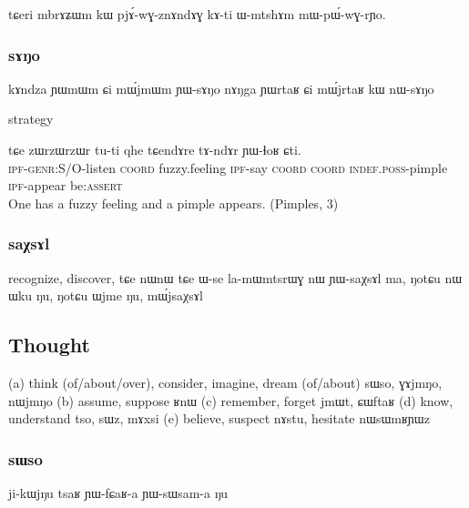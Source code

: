 \documentclass[oldfontcommands,oneside,a4paper,11pt]{article}
\newcommand{\ipa}[1]{{\phon #1}} %
\begin{document}
tɕeri mbrɤʑɯm kɯ pjɤ́-wɣ-znɤndɤɣ kɤ-ti ɯ-mtshɤm mɯ-pɯ́-wɣ-rɲo. 

\subsubsection{sɤŋo}
 kɤndza ɲɯmɯm ɕi mɯ́jmɯm ɲɯ-sɤŋo
 nɤŋga ɲɯrtaʁ ɕi mɯ́jrtaʁ kɯ nɯ-sɤŋo
 
strategy 
 		 \begin{exe}
\ex \label{ex:sANo3}
\gll \ipa{ɲɯ-kɯ-sɤŋo}   	\ipa{tɕe}   	\ipa{zɯrzɯrzɯr}   	\ipa{tu-ti}   	\ipa{qhe}   	\ipa{tɕendɤre}   	\ipa{tɤ-ndɤr}   	\ipa{ɲɯ-ɬoʁ}   	\ipa{ɕti.}\\
\textsc{ipf-genr:S/O}-listen \textsc{coord}  fuzzy.feeling \textsc{ipf}-say \textsc{coord} \textsc{coord} \textsc{indef.poss}-pimple \textsc{ipf}-appear be:\textsc{assert} \\
 \glt  One has a fuzzy feeling and a pimple  appears. (Pimples, 3)
\end{exe} 
 


 \subsubsection{saχsɤl}
recognize, discover,  
tɕe nɯnɯ tɕe ɯ-se la-mɯmtsrɯɣ nɯ ɲɯ-saχsɤl ma,
ŋotɕu nɯ ɯku ŋu, ŋotɕu ɯjme ŋu, mɯ́jsaχsɤl

 
 
  	
 

  \subsection{Thought} 	

(a) think (of/about/over), consider, imagine, dream (of/about)
sɯso, ɣɤjmŋo, nɯjmŋo
(b) assume, suppose ʁnɯ
(c) remember, forget jmɯt, ɕɯftaʁ
(d) know, understand tso, sɯz, mɤxsi
(e) believe, suspect nɤstu, 
hesitate nɯsɯmʁɲɯz


\subsubsection{sɯso}
ji-kɯjŋu tsaʁ ɲɯ-fɕaʁ-a ɲɯ-sɯsam-a ŋu
\end{document}

